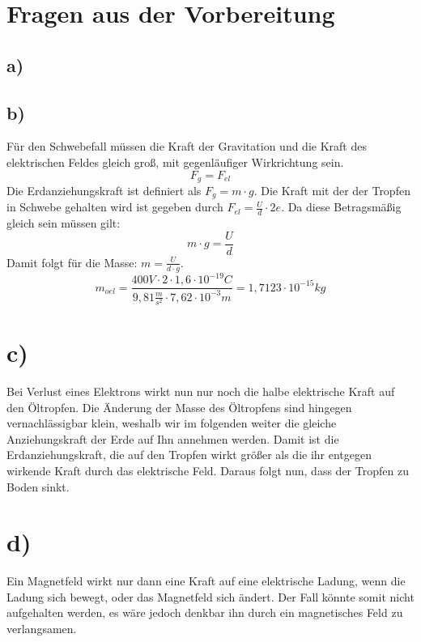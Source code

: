 \section*{Fragen aus der Vorbereitung}
\subsection*{a)}
\subsection*{b)}
Für den Schwebefall müssen die Kraft der Gravitation und die Kraft des elektrischen Feldes gleich groß, mit gegenläufiger Wirkrichtung sein.
\[F_g = F_{el}\]
Die Erdanziehungskraft ist definiert als $F_g = m \cdot g$. Die Kraft mit der der Tropfen in Schwebe gehalten wird ist gegeben durch $F_{el} = \frac{U}{d} \cdot 2e$. Da diese Betragsmäßig gleich sein müssen gilt:
\[m \cdot g  = \frac{U}{d}\]
Damit folgt für die Masse: $m = \frac{U}{d \cdot g}$.
\[m_{oel} = \frac{400V \cdot 2 \cdot 1,6 \cdot 10^{-19}C}{9,81\frac{m}{s^2} \cdot 7,62 \cdot 10^{-3}m} = 1,7123\cdot10^{-15}kg\]
\section*{c)}
Bei Verlust eines Elektrons wirkt nun nur noch die halbe elektrische Kraft auf den Öltropfen. Die Änderung der Masse des Öltropfens sind hingegen vernachlässigbar klein, weshalb wir im folgenden weiter die gleiche Anziehungskraft der Erde auf Ihn annehmen werden. Damit ist die Erdanziehungskraft, die auf den Tropfen wirkt größer als die ihr entgegen wirkende Kraft durch das elektrische Feld. Daraus folgt nun, dass der Tropfen zu Boden sinkt.
\section*{d)}
Ein Magnetfeld wirkt nur dann eine Kraft auf eine elektrische Ladung, wenn die Ladung sich bewegt, oder das Magnetfeld sich ändert. Der Fall könnte somit nicht aufgehalten werden, es wäre jedoch denkbar ihn durch ein magnetisches Feld zu verlangsamen.
